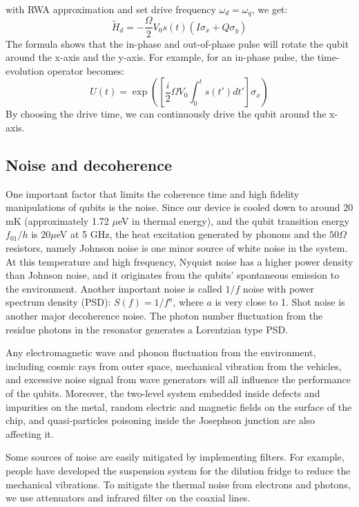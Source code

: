with RWA approximation and set drive frequency $\omega_d = \omega_q$, we get:
\begin{equation}
    \tilde{H}_d = -\frac{\Omega}{2}V_0s(t)(I\sigma_x+Q \sigma_y)
\end{equation}
The formula shows that the in-phase and out-of-phase pulse will rotate the qubit around the x-axis and the y-axis. For example, for an in-phase pulse, the time-evolution operator becomes:
\begin{equation}
    U(t) = \exp([\frac{i}{2}\Omega V_0\int^t_0s(t')dt']\sigma_x)
\end{equation}
By choosing the drive time, we can continuously drive the qubit around the x-axis. 


\subsection{Noise and decoherence}

One important factor that limits the coherence time and high fidelity manipulations of qubits is the noise. Since our device is cooled down to around 20 mK (approximately 1.72 $\mu$eV in thermal energy), and the qubit transition energy $f_{01} / h$ is $20\mu$eV at 5 GHz, the heat excitation generated by phonons and the $50\Omega$ resistors, namely Johnson noise is one minor source of white noise in the system. At this temperature and high frequency, Nyquist noise has a higher power density than Johnson noise, and it originates from the qubits' spontaneous emission to the environment. Another important noise is called $1/f$ noise with power spectrum density (PSD): $S(f) = 1/f^a$, where $a$ is very close to 1. Shot noise is another major decoherence noise. The photon number fluctuation from the residue photons in the resonator generates a Lorentzian type PSD.

Any electromagnetic wave and phonon fluctuation from the environment, including cosmic rays from outer space\cite{RN72}, mechanical vibration from the vehicles, and excessive noise signal from wave generators will all influence the performance of the qubits. Moreover, the two-level system embedded inside defects and impurities on the metal, random electric and magnetic fields on the surface of the chip, and quasi-particles poisoning inside the Josephson junction are also affecting it. 

Some sources of noise are easily mitigated by implementing filters. For example, people have developed the suspension system for the dilution fridge to reduce the mechanical vibrations. To mitigate the thermal noise from electrons and photons, we use attenuators and infrared filter on the coaxial lines. 

